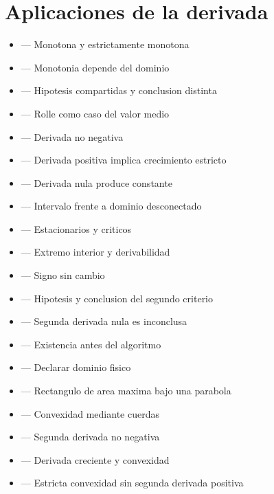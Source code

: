 \documentclass[10pt,a4paper,oneside,openany]{book}
\begin{document}
\section*{Aplicaciones de la derivada}
\begin{itemize}
\item {} — Monotona y estrictamente monotona
\item {} — Monotonia depende del dominio
\item {} — Hipotesis compartidas y conclusion distinta
\item {} — Rolle como caso del valor medio
\item {} — Derivada no negativa
\item {} — Derivada positiva implica crecimiento estricto
\item {} — Derivada nula produce constante
\item {} — Intervalo frente a dominio desconectado
\item {} — Estacionarios y criticos
\item {} — Extremo interior y derivabilidad
\item {} — Signo sin cambio
\item {} — Hipotesis y conclusion del segundo criterio
\item {} — Segunda derivada nula es inconclusa
\item {} — Existencia antes del algoritmo
\item {} — Declarar dominio fisico
\item {} — Rectangulo de area maxima bajo una parabola
\item {} — Convexidad mediante cuerdas
\item {} — Segunda derivada no negativa
\item {} — Derivada creciente y convexidad
\item {} — Estricta convexidad sin segunda derivada positiva

\end{itemize}
\end{document}
